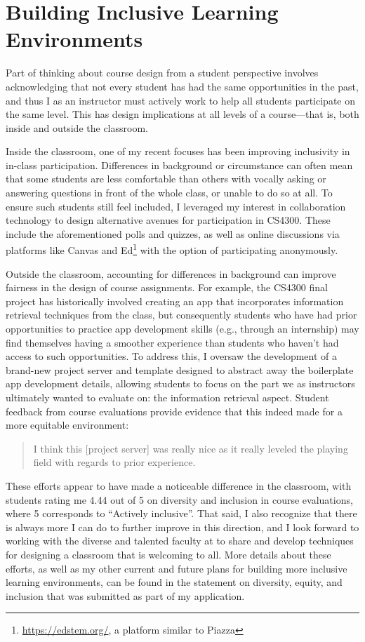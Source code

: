 \documentclass[12pt,letterpaper]{article}
\begin{document}
\section{Building Inclusive Learning Environments}
Part of thinking about course design from a student perspective involves acknowledging that not every student has had the same opportunities in the past, and thus I as an instructor must actively work to help all students participate on the same level.
This has design implications at all levels of a course---that is, both inside and outside the classroom.

Inside the classroom, one of my recent focuses has been improving inclusivity in in-class participation.
Differences in background or circumstance can often mean that some students are less comfortable than others with vocally asking or answering questions in front of the whole class, or unable to do so at all.
To ensure such students still feel included, I leveraged my interest in collaboration technology to design alternative avenues for participation in CS4300.
These include the aforementioned polls and quizzes, as well as online discussions via platforms like Canvas and Ed\footnote{\url{https://edstem.org/}, a platform similar to Piazza} with the option of participating anonymously.

Outside the classroom, accounting for differences in background can improve fairness in the design of course assignments.
For example, the CS4300 final project has historically involved creating an app that incorporates information retrieval techniques from the class, but consequently students who have had prior opportunities to practice app development skills (e.g., through an internship) may find themselves having a smoother experience than students who haven't had access to such opportunities.
To address this, I oversaw the development of a brand-new project server and template designed to abstract away the boilerplate app development details, allowing students to focus on the part we as instructors ultimately wanted to evaluate on: the information retrieval aspect.
Student feedback from course evaluations provide evidence that this indeed made for a more equitable environment:
\begin{quote}
I think this [project server] was really nice as it really leveled the playing field with regards to prior experience.
\end{quote}

These efforts appear to have made a noticeable difference in the classroom, with students rating me 4.44 out of 5 on diversity and inclusion in course evaluations, where 5 corresponds to ``Actively inclusive''.
That said, I also recognize that there is always more I can do to further improve in this direction, and I look forward to working with the diverse and talented faculty at \schoolname to share and develop techniques for designing a classroom that is welcoming to all.
\iflongdei
More details about these efforts, as well as my other current and future plans for building more inclusive learning environments, can be found in the statement on diversity, equity, and inclusion that was submitted as part of my application.
\else
%
\fi
\end{document}
